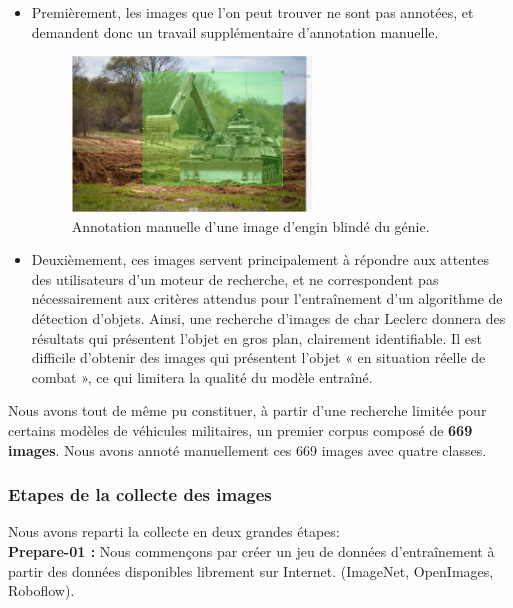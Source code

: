 \begin{itemize}
    \item Premièrement, les images que l’on peut trouver ne sont pas annotées, et demandent donc un travail supplémentaire d’annotation manuelle.
          \begin{figure}[H]
              \center
              \includegraphics[width=0.6\textwidth]{./images/anotation-manuelle.png}
              \caption{Annotation manuelle d’une image d’engin blindé du génie.}\label{fig:anotation-manuelle}
          \end{figure}
    \item Deuxièmement, ces images servent principalement à répondre aux attentes des utilisateurs d’un moteur de recherche, et ne correspondent pas nécessairement aux critères attendus pour l’entraînement d’un algorithme de détection d’objets.
          Ainsi, une recherche d’images de char Leclerc donnera des résultats qui présentent l’objet en gros plan, clairement identifiable.
          Il est difficile d’obtenir des images qui présentent l’objet « en situation réelle de combat », ce qui limitera la qualité du modèle entraîné.
\end{itemize}

Nous avons tout de même pu constituer, à partir d’une recherche limitée pour certains modèles de véhicules militaires, un premier corpus composé de \textbf{669 images}. Nous avons annoté manuellement ces 669 images avec quatre classes.\\


\subsubsection{Etapes de la collecte des images}

Nous avons reparti la collecte en deux grandes étapes:\\

\indent \textbf{Prepare-01 :} Nous commençons par créer un jeu de données d'entraînement à partir des données disponibles librement sur Internet. (ImageNet, OpenImages, Roboflow).

